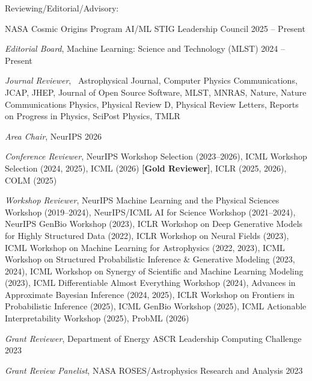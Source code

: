 \documentclass[letterpaper,11pt]{article}
\newenvironment{packed_itemize}{
\begin{itemize}[label=\raisebox{0.25ex}{\tiny$\bullet$}, topsep=0pt, partopsep=0pt]
  \setlength{\itemsep}{4.0pt}
  \setlength{\parskip}{0pt}
  \setlength{\parsep}{0pt}}{\end{itemize}
}
\begin{document}
  \noindent
Reviewing/Editorial/Advisory:
  \begin{packed_itemize}
  \item NASA Cosmic Origins Program AI/ML STIG Leadership Council \hfill 2025 -- Present
  \item \emph{Editorial Board}, Machine Learning: Science and Technology (MLST) \hfill 2024 -- Present
  \item \emph{Journal Reviewer}, \ \scriptsize{Astrophysical Journal, Computer Physics Communications, JCAP, JHEP,  Journal of Open Source Software, MLST, MNRAS, Nature, Nature Communications Physics, Physical Review {D}, Physical Review {Letters}, Reports on Progress in Physics, SciPost Physics, TMLR}\normalsize
  \item \emph{Area Chair}, NeurIPS \hfill 2026
    \item \emph{Conference Reviewer}, \scriptsize{NeurIPS Workshop Selection (2023--2026), ICML Workshop Selection (2024, 2025), ICML (2026) \textbf{[Gold Reviewer]}, ICLR (2025, 2026), COLM (2025)}\normalsize
  \item \emph{Workshop Reviewer},  \scriptsize{NeurIPS Machine Learning and the Physical Sciences Workshop (2019--2024), NeurIPS/ICML AI for Science Workshop (2021--2024), NeurIPS GenBio Workshop (2023), ICLR Workshop on Deep Generative Models for Highly Structured Data (2022), ICLR Workshop on Neural Fields (2023), ICML Workshop on Machine Learning for Astrophysics (2022, 2023), ICML Workshop on Structured Probabilistic Inference \& Generative Modeling (2023, 2024), ICML Workshop on Synergy of Scientific and Machine Learning Modeling (2023), ICML Differentiable Almost Everything Workshop (2024),  Advances in Approximate Bayesian Inference (2024, 2025), ICLR Workshop on Frontiers in Probabilistic Inference (2025), ICML GenBio Workshop (2025), ICML Actionable Interpretability Workshop (2025), ProbML (2026)}\normalsize
  \item \emph{Grant Reviewer}, Department of Energy ASCR Leadership Computing Challenge \hfill 2023
  \item \emph{Grant Review Panelist}, NASA ROSES/Astrophysics Research and Analysis \hfill 2023
  
  \end{packed_itemize}

\end{document}
